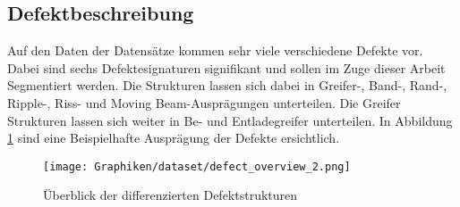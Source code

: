   




  

 \subsection{Defektbeschreibung}
 \label{sub:defect}
  Auf den Daten der Datensätze kommen sehr viele verschiedene Defekte vor. Dabei sind sechs Defektesignaturen signifikant und sollen im Zuge dieser Arbeit Segmentiert werden. 
  Die Strukturen lassen sich dabei in Greifer-, Band-, Rand-, Ripple-, Riss- und Moving Beam-Ausprägungen unterteilen. Die Greifer Strukturen lassen sich weiter in Be- und Entladegreifer unterteilen. In Abbildung \ref{fig:defect_overview} sind eine Beispielhafte Ausprägung der Defekte ersichtlich. 

\begin{figure}[]
    \centering
    \texttt{[image: Graphiken/dataset/defect\_overview\_2.png]}
    \caption{ Überblick der differenzierten Defektstrukturen}
    \label{fig:defect_overview}
\end{figure}

